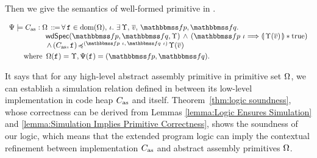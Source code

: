 Then we give the semantics of well-formed primitive in
\Def{\ref{def:wdprim-sem}}.
\begin{definition}
    \em
    \label{def:wdprim-sem}
    \small
    \[
        \begin{array}{l}
            \semWdPrim{\Cspec}{\asmimp}{\hprimset}
            \, \define \,
            \forall \, \lab{} \in \dom(\hprimset), \,
            \lgvl. \
            \exists \, \hprim, \, \args{\val}, \,
            \relspecpre, \relspecpost.  \\
            \hspace*{5em}
            \wdSpec{\relspecpre}{\relspecpost} {\hprim}
            	\, \land \,
            	(\relspecpre \ \lgvl \Longrightarrow
            	\safePrimAst{\, \hprim(\args{\val}) \,}
                \sepstar \atrue) \\
            \hspace*{5em}
            \, \land \,
            \simFunction{(\asmimp, \lab{})}
                {(\relspecpre \ \lgvl, \,
                    \relspecpost \ \lgvl)}
                {\hprim(\args{\val})}
            \\
            \\[-9pt]
            \hspace*{2em}
            \TYPE{where } \,
            \hprimset(\lab{}) = \hprim,
            \Cspec(\lab{}) = (\relspecpre, \relspecpost).
        \end{array}
    \]
\end{definition}
It says that for any high-level
abstract assembly primitive
in primitive set $\Omega$,
we can establish a simulation relation
defined in \Def{\ref{def:simfunc}}
between its low-level implementation
in code heap $C_{\text{as}}$ and itself.
Theorem~\ref{thm:logic soundness},
whose correctness can be derived from Lemmas
\ref{lemma:Logic Ensures Simulation}
and \ref{lemma:Simulation Implies Primitive Correctness},
shows the soundness of our logic,
which means that the extended program logic can
imply the contextual refinement between implementation
$C_{\text{as}}$ and abstract assembly primitives $\Omega$.

